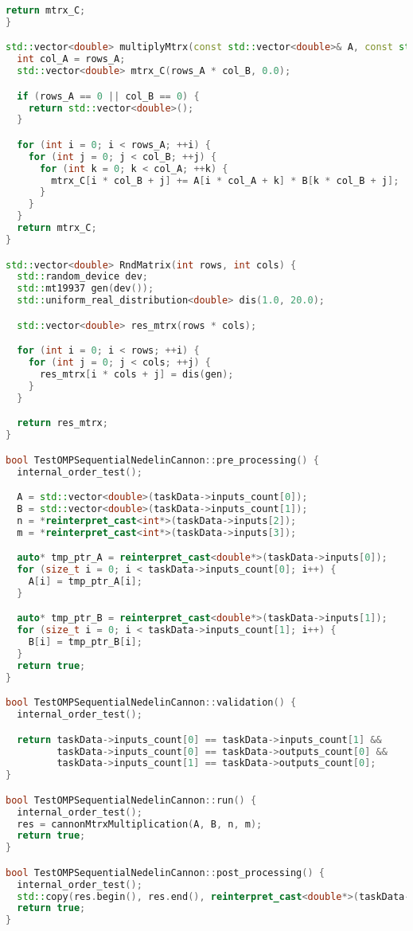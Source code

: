 \documentclass{report}
\begin{document}
\begin{lstlisting}[language=C++,caption=OpenMP версия]
  return mtrx_C;
}

std::vector<double> multiplyMtrx(const std::vector<double>& A, const std::vector<double>& B, int rows_A, int col_B) {
  int col_A = rows_A;
  std::vector<double> mtrx_C(rows_A * col_B, 0.0);

  if (rows_A == 0 || col_B == 0) {
    return std::vector<double>();
  }

  for (int i = 0; i < rows_A; ++i) {
    for (int j = 0; j < col_B; ++j) {
      for (int k = 0; k < col_A; ++k) {
        mtrx_C[i * col_B + j] += A[i * col_A + k] * B[k * col_B + j];
      }
    }
  }
  return mtrx_C;
}

std::vector<double> RndMatrix(int rows, int cols) {
  std::random_device dev;
  std::mt19937 gen(dev());
  std::uniform_real_distribution<double> dis(1.0, 20.0);

  std::vector<double> res_mtrx(rows * cols);

  for (int i = 0; i < rows; ++i) {
    for (int j = 0; j < cols; ++j) {
      res_mtrx[i * cols + j] = dis(gen);
    }
  }

  return res_mtrx;
}

bool TestOMPSequentialNedelinCannon::pre_processing() {
  internal_order_test();

  A = std::vector<double>(taskData->inputs_count[0]);
  B = std::vector<double>(taskData->inputs_count[1]);
  n = *reinterpret_cast<int*>(taskData->inputs[2]);
  m = *reinterpret_cast<int*>(taskData->inputs[3]);

  auto* tmp_ptr_A = reinterpret_cast<double*>(taskData->inputs[0]);
  for (size_t i = 0; i < taskData->inputs_count[0]; i++) {
    A[i] = tmp_ptr_A[i];
  }

  auto* tmp_ptr_B = reinterpret_cast<double*>(taskData->inputs[1]);
  for (size_t i = 0; i < taskData->inputs_count[1]; i++) {
    B[i] = tmp_ptr_B[i];
  }
  return true;
}

bool TestOMPSequentialNedelinCannon::validation() {
  internal_order_test();

  return taskData->inputs_count[0] == taskData->inputs_count[1] &&
         taskData->inputs_count[0] == taskData->outputs_count[0] &&
         taskData->inputs_count[1] == taskData->outputs_count[0];
}

bool TestOMPSequentialNedelinCannon::run() {
  internal_order_test();
  res = cannonMtrxMultiplication(A, B, n, m);
  return true;
}

bool TestOMPSequentialNedelinCannon::post_processing() {
  internal_order_test();
  std::copy(res.begin(), res.end(), reinterpret_cast<double*>(taskData->outputs[0]));
  return true;
}


\end{lstlisting}
\end{document}
